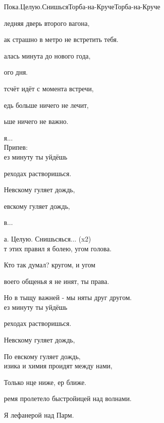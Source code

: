 \documentclass[11pt,a5paper]{book}
\renewcommand{\tt}{\indent \indent}
\begin{document}
\begin{song}{Пока.Целую.Снишься}{}{Торба-на-Круче}{Торба-на-Круче}{}{}

ледняя дверь второго вагона,\par
{}ак страшно в метро не встретить тебя.\par
{}алась минута до нового года, \par
{}ого дня. \par
{}тсчёт идёт с момента встречи,\par 
{}едь больше ничего не лечит, \par
{}ьше ничего не важно.\par
{} я...\\

Припев:\\
\tt{}ез минуту ты уйдёшь \par
\tt{}реходах растворишься.\par 
\tt{} Невскому гуляет дождь,\par
{} евскому гуляет дождь,\par 
\tt{}в... \par
\tt{}а. Целую. Снишьсяься... (x2)\\

т этих правил я болею, угом голова. \par
Кто так думал?  кругом, и угом\par
{}воего общенья я не инят, ты права. \par
Но в тыщу  важней - мы няты друг другом. \\

ез минуту ты уйдёшь \par
{}реходах растворишься.\par 
{} Невскому гуляет дождь,\par
По евскому гуляет дождь,\\

изика и химия проидят между нами, \par
Только нце ниже, ер ближе. \par
{}ремя пролетело быстройицей над волнами.\par 
Я лефанерой над Парм. \\


\end{song}
\end{document}
